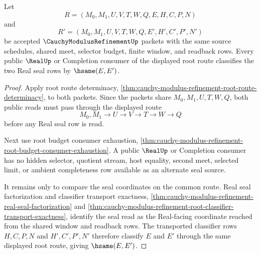 \begin{theorem}
\label{thm:cauchy-modulus-refinement-root-window-real-seal-determinacy}
Let
$$
R=(M_0,M_1,U,V,T,W,Q,E,H,C,P,N)
$$
and
$$
R'=(M_0,M_1,U,V,T,W,Q,E',H',C',P',N')
$$
be accepted $\CauchyModulusRefinementUp$ packets with the same source schedules, shared meet, selector budget, finite window, and readback rows. Every public $\RealUp$ or Completion consumer of the displayed root route classifies the two Real seal rows by $\hsame(E,E')$.
\end{theorem}
\begin{proof}
Apply root route determinacy, \autoref{thm:cauchy-modulus-refinement-root-route-determinacy}, to both packets. Since the packets share $M_0,M_1,U,T,W,Q$, both public reads must pass through the displayed route
$$
M_0,M_1 \longrightarrow U \longrightarrow V \longrightarrow T \longrightarrow W \longrightarrow Q
$$
before any Real seal row is read.

Next use root budget consumer exhaustion, \autoref{thm:cauchy-modulus-refinement-root-budget-consumer-exhaustion}. A public $\RealUp$ or Completion consumer has no hidden selector, quotient stream, host equality, second meet, selected limit, or ambient completeness row available as an alternate seal source.

It remains only to compare the seal coordinates on the common route. Real seal factorization and classifier transport exactness, \autoref{thm:cauchy-modulus-refinement-real-seal-factorization} and \autoref{thm:cauchy-modulus-refinement-root-classifier-transport-exactness}, identify the seal read as the Real-facing coordinate reached from the shared window and readback rows. The transported classifier rows $H,C,P,N$ and $H',C',P',N'$ therefore classify $E$ and $E'$ through the same displayed root route, giving $\hsame(E,E')$.
\end{proof}

